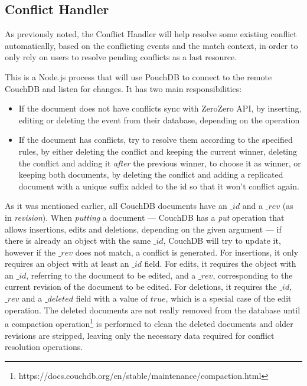 \subsection{Conflict Handler}

As previously noted, the Conflict Handler will help resolve some existing conflict automatically, based on the conflicting events and the match context, in order to only rely on users to resolve pending conflicts as a last resource.

This is a Node.js process that will use PouchDB to connect to the remote CouchDB and listen for changes. It has two main responsibilities:
\begin{itemize}
    \item If the document does not have conflicts sync with ZeroZero API, by inserting, editing or deleting the event from their database, depending on the operation
    \item If the document has conflicts, try to resolve them according to the specified rules, by either deleting the conflict and keeping the current winner, deleting the conflict and adding it \textit{after} the previous winner, to choose it as winner, or keeping both documents, by deleting the conflict and adding a replicated document with a unique suffix added to the id so that it won't conflict again.
\end{itemize}

As it was mentioned earlier, all CouchDB documents have an $\_id$ and a $\_rev$ (as in \textit{revision}). When \textit{putting} a document --- CouchDB has a \textit{put} operation that allows insertions, edits and deletions, depending on the given argument --- if there is already an object with the same $\_id$, CouchDB will try to update it, however if the $\_rev$ does not match, a conflict is generated. For insertions, it only requires an object with at least an $\_id$ field. For edits, it requires the object with an $\_id$, referring to the document to be edited, and a $\_rev$, corresponding to the current revision of the document to be edited. For deletions, it requires the $\_id$, $\_rev$ and a $\_deleted$ field with a value of $true$, which is a special case of the edit operation. The deleted documents are not really removed from the database until a compaction operation\footnote{https://docs.couchdb.org/en/stable/maintenance/compaction.html} is performed to clean the deleted documents and older revisions are stripped, leaving only the necessary data required for conflict resolution operations.

